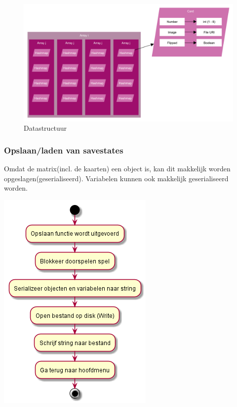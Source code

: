 \documentclass[a4paper,titlepage,11pt]{article}
\begin{document}
\begin{figure}[!hb]
  \includegraphics[width=\linewidth]{../Images/datastructure.pdf}
  \caption{Datastructuur}\label{fig:datastructure}
\end{figure}

\subsubsection{Opslaan/laden van savestates}

Omdat de matrix(incl. de kaarten) een object is,
kan dit makkelijk worden opgeslagen(geserialiseerd).
Variabelen kunnen ook makkelijk geserialiseerd worden.

\begin{center}
\includegraphics[width=.5\linewidth]{../Images/serialization.png}
\end{center}
\end{document}
